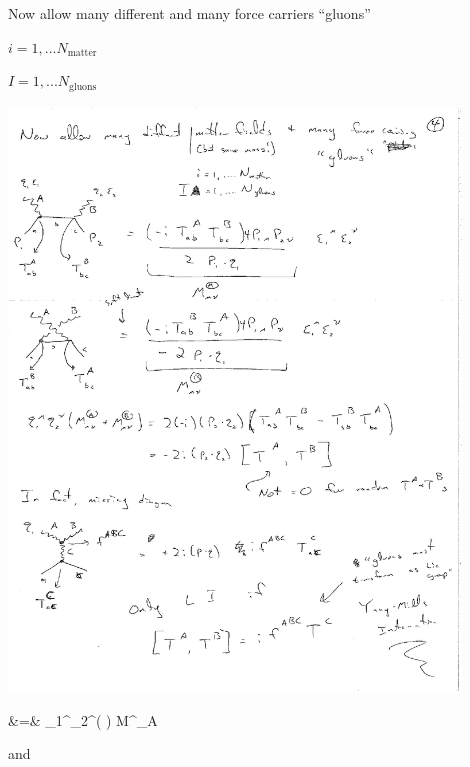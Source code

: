 {Now allow many different  and many force carriers ``gluons'' 

$i = 1, ... N_{\textrm{matter}}$

$I = 1, ... N_{\textrm{gluons}}$

\begin{minipage}{0.4\textwidth}
\includegraphics[width=0.9\textwidth]{./comptonScattering5.pdf}
\end{minipage} %
\begin{minipage}{0.45\textwidth}
\bea
&=&  \epsilon_1^\mu \epsilon_2^\nu \left(  \right) \equiv M^{\mu\nu}_A
\eea
\end{minipage} %

and 


}
